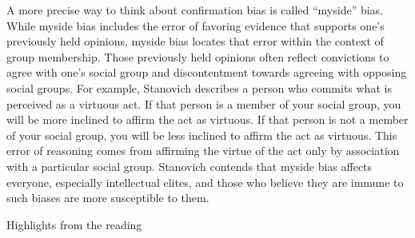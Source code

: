 \documentclass[
]{book}
\begin{document}
A more precise way to think about confirmation bias is called ``myside'' bias. While myside bias includes the error of favoring evidence that supports one's previously held opinions, myside bias locates that error within the context of group membership. Those previously held opinions often reflect convictions to agree with one's social group and discontentment towards agreeing with opposing social groups. For example, Stanovich describes a person who commits what is perceived as a virtuous act. If that person is a member of your social group, you will be more inclined to affirm the act as virtuous. If that person is not a member of your social group, you will be less inclined to affirm the act as virtuous. This error of reasoning comes from affirming the virtue of the act only by association with a particular social group. Stanovich contends that myside bias affects everyone, especially intellectual elites, and those who believe they are immune to such biases are more susceptible to them.

Highlights from the reading
\end{document}
